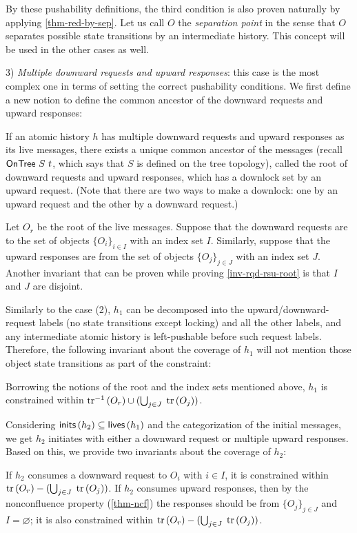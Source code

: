 By these pushability definitions, the third condition is also proven naturally by applying \autoref{thm-red-by-sep}.
Let us call $O$ the \emph{separation point} in the sense that $O$ separates possible state transitions by an intermediate history.
This concept will be used in the other cases as well.

3) \emph{Multiple downward requests and upward responses}: this case is the most complex one in terms of setting the correct pushability conditions.
We first define a new notion to define the common ancestor of the downward requests and upward responses:
\begin{invariant}\label{inv-rqd-rsu-root}
  If an atomic history $h$ has multiple downward requests and upward responses as its live messages, there exists a unique common ancestor of the messages (recall $\mathsf{OnTree}\ S\ t$, which says that $S$ is defined on the tree topology), called the root of downward requests and upward responses, which has a downlock set by an upward request.
  (Note that there are two ways to make a downlock: one by an upward request and the other by a downward request.)
\end{invariant}
Let $O_r$ be the root of the live messages.
Suppose that the downward requests are to the set of objects $\{O_i\}_{i \in I}$ with an index set $I$.
Similarly, suppose that the upward responses are from the set of objects $\{O_j\}_{j \in J}$ with an index set $J$.
Another invariant that can be proven while proving \autoref{inv-rqd-rsu-root} is that $I$ and $J$ are disjoint.

Similarly to the case (2), $h_1$ can be decomposed into the upward/downward-request labels (no state transitions except locking) and all the other labels, and any intermediate atomic history is left-pushable before such request labels.
Therefore, the following invariant about the coverage of $h_1$ will not mention those object state transitions as part of the constraint:
\begin{invariant}\label{inv-rqd-rsu-live}
  Borrowing the notions of the root and the index sets mentioned above, $h_1$ is constrained within $\textrm{tr}^{-1}\,(O_r) \cup (\bigcup_{j \in J}\; \textrm{tr}\,(O_j))$.
\end{invariant}

Considering $\mathsf{inits}\,(h_2) \subseteq \mathsf{lives}\,(h_1)$ and the categorization of the initial messages, we get $h_2$ initiates with either a downward request or multiple upward responses.
Based on this, we provide two invariants about the coverage of $h_2$:
\begin{invariant}\label{inv-rqd-rsu-init}
  If $h_2$ consumes a downward request to $O_i$ with $i \in I$, it is constrained within $\textrm{tr}\,(O_r) - (\bigcup_{j \in J}\; \textrm{tr}\,(O_j))$.
  If $h_2$ consumes upward responses, then by the nonconfluence property (\autoref{thm-ncf}) the responses should be from $\{O_j\}_{j \in J}$ and $I = \varnothing$; it is also constrained within $\textrm{tr}\,(O_r) - (\bigcup_{j \in J}\; \textrm{tr}\,(O_j))$.
\end{invariant}

